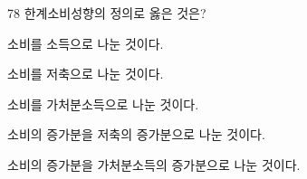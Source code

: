 \begin{question}{78}
한계소비성향의 정의로 옳은 것은?
\begin{choices}
  \item 소비를 소득으로 나눈 것이다.
  \item 소비를 저축으로 나눈 것이다.
  \item 소비를 가처분소득으로 나눈 것이다.
  \item 소비의 증가분을 저축의 증가분으로 나눈 것이다.
  \item 소비의 증가분을 가처분소득의 증가분으로 나눈 것이다.
\end{choices}
\end{question}
